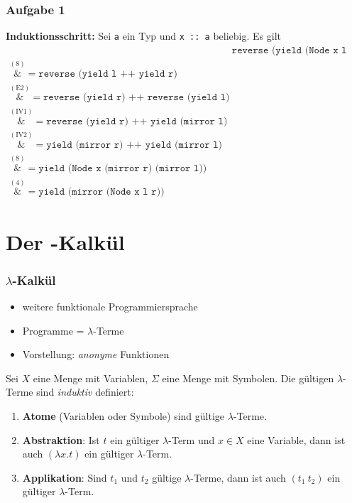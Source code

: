 \documentclass{beamer}
\newcommand*{\astep}[2][]{\ensuremath{\overset{{#1} (\text{#2})}&{=}}}
\begin{document}
\begin{frame} \frametitle{Aufgabe 1}
	\scriptsize
	\textbf{Induktionsschritt:} Sei \texttt{a} ein Typ und \texttt{x :: a} beliebig. Es gilt
	\begin{align*}
		&\texttt{reverse (yield (Node x l r))} \\
		\astep{8} \texttt{reverse (yield l ++ yield r)} \\
		\astep{E2}\texttt{reverse (yield r) ++ reverse (yield l)} \\
		\astep{IV1} \texttt{reverse (yield r) ++ yield (mirror l)} \\
		\astep{IV2} \texttt{yield (mirror r) ++ yield (mirror l)} \\
		\astep{8} \texttt{yield (Node x (mirror r) (mirror l))} \\
		\astep{4} \texttt{yield (mirror (Node x l r))}
		\end{align*}
\end{frame}

\section{Der \textlambda-Kalkül}

\begin{frame} \frametitle{$\lambda$-Kalkül}
	\footnotesize
	\begin{itemize}
		\item weitere funktionale Programmiersprache
		\item Programme = $\lambda$-Terme
		\item Vorstellung: \textit{anonyme} Funktionen
	\end{itemize}
	\pause
	
	Sei $X$ eine Menge mit Variablen, $\Sigma$ eine Menge mit Symbolen. Die gültigen $\lambda$-Terme sind \textit{induktiv} definiert:
	\begin{enumerate}[<+->]
		\item \textbf{Atome} (Variablen oder Symbole) sind gültige $\lambda$-Terme.
		\item \textbf{Abstraktion}: Ist $t$ ein gültiger $\lambda$-Term und $x \in X$ eine Variable, dann ist auch $(\lambda x . t)$ ein gültiger $\lambda$-Term.
		\item \textbf{Applikation}: Sind $t_1$ und $t_2$ gültige $\lambda$-Terme, dann ist auch $(t_1 \ t_2)$ ein gültiger $\lambda$-Term.
	\end{enumerate}
\end{frame}
\end{document}
